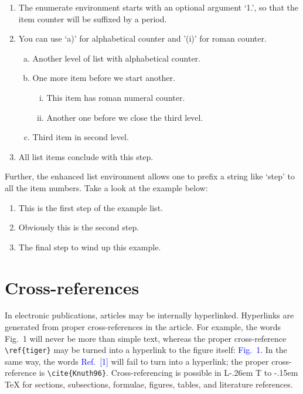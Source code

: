 \documentclass[a4paper,12pt]{article}
\makeatletter
\DeclareRobustCommand{\LaTeX}{L\kern-.26em%
        {\sbox\z@ T%
         \vbox to\ht\z@{\hbox{\check@mathfonts
           \fontsize\sf@size\z@
           \math@fontsfalse\selectfont
          A\,}%
         \vss}%
        }%
     \kern-.15em%
    \TeX}
\makeatother
\begin{document}
\begin{vquote}
 \begin{enumerate}[1.]
 \item The enumerate environment starts with an optional
   argument `1.', so that the item counter will be suffixed
   by a period.
 \item You can use `a)' for alphabetical counter and '(i)' for
   roman counter.
  \begin{enumerate}[a)]
    \item Another level of list with alphabetical counter.
    \item One more item before we start another.
    \begin{enumerate}[(i)]
     \item This item has roman numeral counter.
     \item Another one before we close the third level.
    \end{enumerate}
    \item Third item in second level.
  \end{enumerate}
 \item All list items conclude with this step.
 \end{enumerate}
\end{vquote}

\vspace*{12pt}
\def\rulecolor{blue!70}
\def\rulecolor{orange}


Further, the enhanced list environment allows one to prefix a
string like `step' to all the item numbers.  Take a look at the
example below:

\begin{vquote}
 \begin{enumerate}[Step 1.]
  \item This is the first step of the example list.
  \item Obviously this is the second step.
  \item The final step to wind up this example.
 \end{enumerate}
\end{vquote}

\def\rulecolor{blue!70}
\def\rulecolor{orange}

\vspace*{-18pt}

\section{Cross-references}
In electronic publications, articles may be internally
hyperlinked. Hyperlinks are generated from proper
cross-references in the article.  For example, the words
\textcolor{black!80}{Fig.~1} will never be more than simple text,
whereas the proper cross-reference \verb+\ref{tiger}+ may be
turned into a hyperlink to the figure itself:
\textcolor{blue}{Fig.~1}.  In the same way,
the words \textcolor{blue}{Ref.~[1]} will fail to turn into a
hyperlink; the proper cross-reference is \verb+\cite{Knuth96}+.
Cross-referencing is possible in \LaTeX{} for sections,
subsections, formulae, figures, tables, and literature
references.
\end{document}
